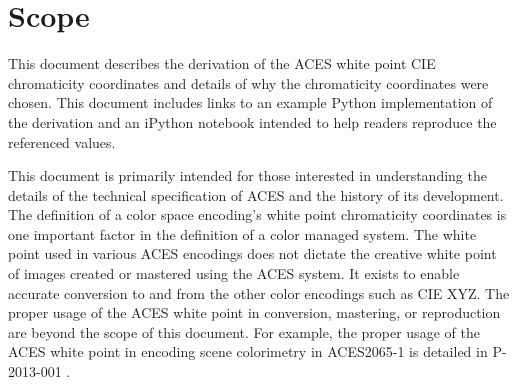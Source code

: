 \cleardoublepage
\numberedformat	
\chapter{Scope} 	%

This document describes the derivation of the ACES white point CIE chromaticity coordinates and details of why the chromaticity coordinates were chosen.  This document includes links to an example Python implementation of the derivation and an iPython notebook intended to help readers reproduce the referenced values.

This document is primarily intended for those interested in understanding the details of the technical specification of ACES and the history of its development. The definition of a color space encoding's white point chromaticity coordinates is one important factor in the definition of a color managed system. The white point used in various ACES encodings does not dictate the creative white point of images created or mastered using the ACES system. It exists to enable accurate conversion to and from the other color encodings such as CIE XYZ.  The proper usage of the ACES white point in conversion, mastering, or reproduction are beyond the scope of this document.  For example, the proper usage of the ACES white point in encoding scene colorimetry in ACES2065-1 is detailed in P-2013-001 \cite{idt}.  

